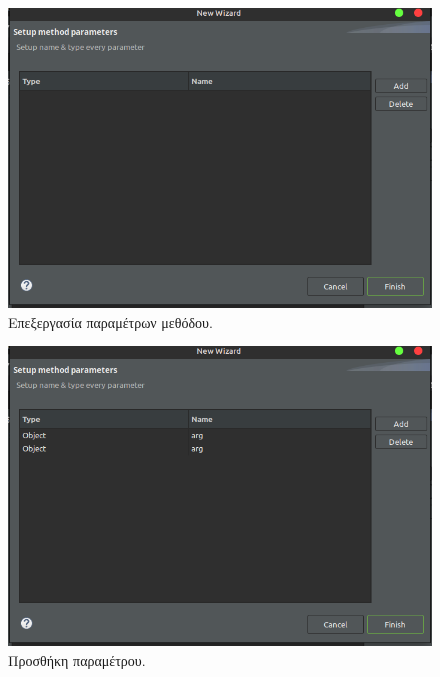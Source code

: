 \begin{figure}[H]
    \centering
    \includegraphics[width=1.0\textwidth]{Figures/edit_parameters.png}
    \caption{Επεξεργασία παραμέτρων μεθόδου.}
    \label{fig:edit_parameters}
\end{figure}
\begin{figure}[H]
    \centering
    \includegraphics[width=1.0\textwidth]{Figures/add_parameters.png}
    \caption{Προσθήκη παραμέτρου.}
    \label{fig:add_parameters}
\end{figure}
